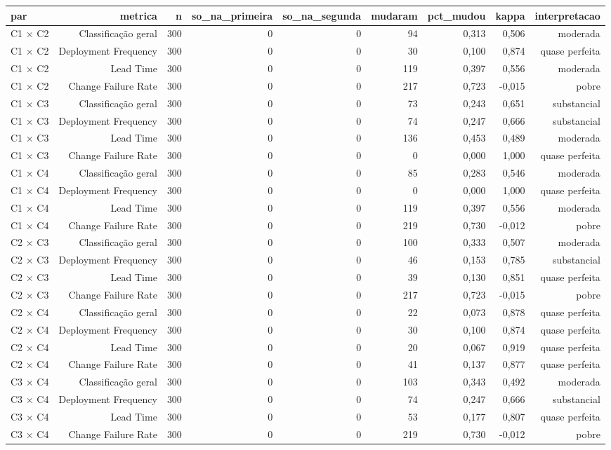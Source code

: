 \begin{tabular}{lrrrrrrrr}
\hline
par & metrica & n & so\_na\_primeira & so\_na\_segunda & mudaram & pct\_mudou & kappa & interpretacao \\
\hline
C1 × C2 & Classificação geral & 300 & 0 & 0 & 94 & 0,313 & 0,506 & moderada \\
C1 × C2 & Deployment Frequency & 300 & 0 & 0 & 30 & 0,100 & 0,874 & quase perfeita \\
C1 × C2 & Lead Time & 300 & 0 & 0 & 119 & 0,397 & 0,556 & moderada \\
C1 × C2 & Change Failure Rate & 300 & 0 & 0 & 217 & 0,723 & -0,015 & pobre \\
C1 × C3 & Classificação geral & 300 & 0 & 0 & 73 & 0,243 & 0,651 & substancial \\
C1 × C3 & Deployment Frequency & 300 & 0 & 0 & 74 & 0,247 & 0,666 & substancial \\
C1 × C3 & Lead Time & 300 & 0 & 0 & 136 & 0,453 & 0,489 & moderada \\
C1 × C3 & Change Failure Rate & 300 & 0 & 0 & 0 & 0,000 & 1,000 & quase perfeita \\
C1 × C4 & Classificação geral & 300 & 0 & 0 & 85 & 0,283 & 0,546 & moderada \\
C1 × C4 & Deployment Frequency & 300 & 0 & 0 & 0 & 0,000 & 1,000 & quase perfeita \\
C1 × C4 & Lead Time & 300 & 0 & 0 & 119 & 0,397 & 0,556 & moderada \\
C1 × C4 & Change Failure Rate & 300 & 0 & 0 & 219 & 0,730 & -0,012 & pobre \\
C2 × C3 & Classificação geral & 300 & 0 & 0 & 100 & 0,333 & 0,507 & moderada \\
C2 × C3 & Deployment Frequency & 300 & 0 & 0 & 46 & 0,153 & 0,785 & substancial \\
C2 × C3 & Lead Time & 300 & 0 & 0 & 39 & 0,130 & 0,851 & quase perfeita \\
C2 × C3 & Change Failure Rate & 300 & 0 & 0 & 217 & 0,723 & -0,015 & pobre \\
C2 × C4 & Classificação geral & 300 & 0 & 0 & 22 & 0,073 & 0,878 & quase perfeita \\
C2 × C4 & Deployment Frequency & 300 & 0 & 0 & 30 & 0,100 & 0,874 & quase perfeita \\
C2 × C4 & Lead Time & 300 & 0 & 0 & 20 & 0,067 & 0,919 & quase perfeita \\
C2 × C4 & Change Failure Rate & 300 & 0 & 0 & 41 & 0,137 & 0,877 & quase perfeita \\
C3 × C4 & Classificação geral & 300 & 0 & 0 & 103 & 0,343 & 0,492 & moderada \\
C3 × C4 & Deployment Frequency & 300 & 0 & 0 & 74 & 0,247 & 0,666 & substancial \\
C3 × C4 & Lead Time & 300 & 0 & 0 & 53 & 0,177 & 0,807 & quase perfeita \\
C3 × C4 & Change Failure Rate & 300 & 0 & 0 & 219 & 0,730 & -0,012 & pobre \\
\hline
\end{tabular}
